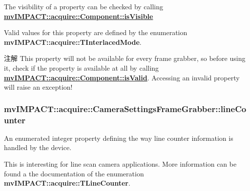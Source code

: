 The visibility of a property can be checked by calling {\bfseries \hyperlink{classmv_i_m_p_a_c_t_1_1acquire_1_1_component_ae9f95ac45440af06f7d36990ad633a73}{mv\+I\+M\+P\+A\+C\+T\+::acquire\+::\+Component\+::is\+Visible}} 

Valid values for this property are defined by the enumeration {\bfseries mv\+I\+M\+P\+A\+C\+T\+::acquire\+::\+T\+Interlaced\+Mode}.

\begin{DoxyNote}{注解}
This property will not be available for every frame grabber, so before using it, check if the property is available at all by calling {\bfseries \hyperlink{classmv_i_m_p_a_c_t_1_1acquire_1_1_component_ac51e55e7e046101f3c6119d84123abd5}{mv\+I\+M\+P\+A\+C\+T\+::acquire\+::\+Component\+::is\+Valid}}. Accessing an invalid property will raise an exception! 
\end{DoxyNote}
\hypertarget{classmv_i_m_p_a_c_t_1_1acquire_1_1_camera_settings_frame_grabber_a91835afe55d029af84a48915ad5081da}{
\subsubsection[{line\+Counter}]{ mv\+I\+M\+P\+A\+C\+T\+::acquire\+::\+Camera\+Settings\+Frame\+Grabber\+::line\+Counter}}\label{classmv_i_m_p_a_c_t_1_1acquire_1_1_camera_settings_frame_grabber_a91835afe55d029af84a48915ad5081da}


An enumerated integer property defining the way line counter information is handled by the device. 

This is interesting for line scan camera applications. More information can be found a the documentation of the enumeration {\bfseries mv\+I\+M\+P\+A\+C\+T\+::acquire\+::\+T\+Line\+Counter}.

